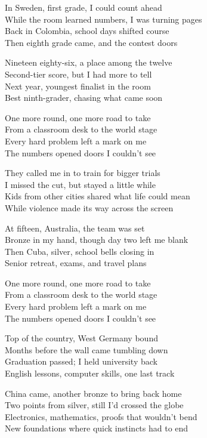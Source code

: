 \begin{lyrics}
In Sweden, first grade, I could count ahead\\
While the room learned numbers, I was turning pages\\
Back in Colombia, school days shifted course\\
Then eighth grade came, and the contest doors

Nineteen eighty-six, a place among the twelve\\
Second-tier score, but I had more to tell\\
Next year, youngest finalist in the room\\
Best ninth-grader, chasing what came soon

One more round, one more road to take\\
From a classroom desk to the world stage\\
Every hard problem left a mark on me\\
The numbers opened doors I couldn’t see

They called me in to train for bigger trials\\
I missed the cut, but stayed a little while\\
Kids from other cities shared what life could mean\\
While violence made its way across the screen

At fifteen, Australia, the team was set\\
Bronze in my hand, though day two left me blank\\
Then Cuba, silver, school bells closing in\\
Senior retreat, exams, and travel plans

One more round, one more road to take\\
From a classroom desk to the world stage\\
Every hard problem left a mark on me\\
The numbers opened doors I couldn’t see

Top of the country, West Germany bound\\
Months before the wall came tumbling down\\
Graduation passed; I held university back\\
English lessons, computer skills, one last track

China came, another bronze to bring back home\\
Two points from silver, still I’d crossed the globe\\
Electronics, mathematics, proofs that wouldn’t bend\\
New foundations where quick instincts had to end


\end{lyrics}
